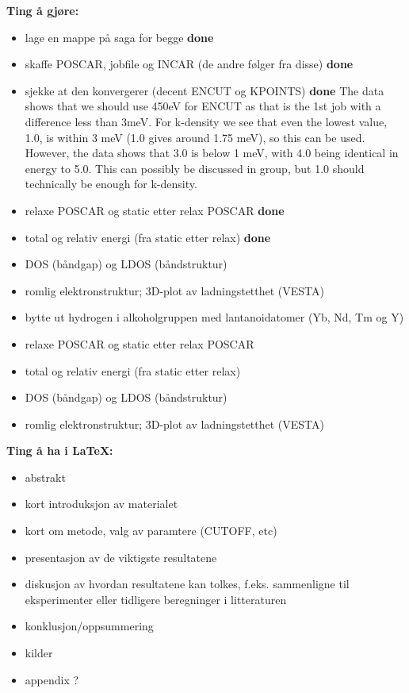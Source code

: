 \documentclass{article}
\begin{document}
\textbf{Ting å gjøre:}
\begin{itemize}
    \item lage en mappe på saga for begge
    \subitem \textbf{done}
    \item skaffe POSCAR, jobfile og INCAR (de andre følger fra disse)
    \subitem \textbf{done}
    \item sjekke at den konvergerer (decent ENCUT og KPOINTS)
    \subitem \textbf{done}
    \subitem The data shows that we should use 450eV for ENCUT as that is the 1st job with a difference less than 3meV.
    \subitem For k-density we see that even the lowest value, 1.0, is within 3 meV (1.0 gives around 1.75 meV), so this can be used. However, the data shows that 3.0 is below 1 meV, with 4.0 being identical in energy to 5.0. This can possibly be discussed in group, but 1.0 should technically be enough for k-density.
    \item relaxe POSCAR og static etter relax POSCAR
    \subitem \textbf{done}
    \item total og relativ energi (fra static etter relax)
    \subitem \textbf{done}
    \item DOS (båndgap) og LDOS (båndstruktur)
    \item romlig elektronstruktur; 3D-plot av ladningstetthet (VESTA)
    \item bytte ut hydrogen i alkoholgruppen med lantanoidatomer (Yb, Nd, Tm og Y)
    \item relaxe POSCAR og static etter relax POSCAR
    \item total og relativ energi (fra static etter relax)
    \item DOS (båndgap) og LDOS (båndstruktur)
    \item romlig elektronstruktur; 3D-plot av ladningstetthet (VESTA)
\end{itemize}

\vspace{1cm}

\textbf{Ting å ha i \LaTeX:}
\begin{itemize}
    \item abstrakt
    \item kort introduksjon av materialet
    \item kort om metode, valg av paramtere (CUTOFF, etc)
    \item presentasjon av de viktigste resultatene
    \item diskusjon av hvordan resultatene kan tolkes, f.eks. sammenligne til eksperimenter eller tidligere beregninger i litteraturen
    \item konklusjon/oppsummering
    \item kilder
    \item appendix ?
\end{itemize}
\end{document}
